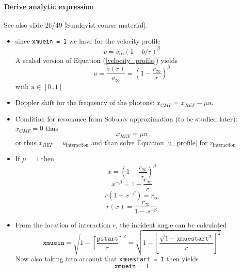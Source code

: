 \documentclass[../main/main.tex]{subfiles}
\begin{document}
\paragraph{\underline{Derive analytic expression}} See also slide  26/49 [Sundqvist course material]. 
\begin{itemize}
\item since \texttt{xmuein = 1} we have for the velocity profile 
\begin{equation}
v = v_{\infty}(1-b/r)^{\beta}
\label{velocity_profile}
\end{equation}
A scaled version of Equation (\ref{velocity_profile}) yields 
\begin{equation}
u = \frac{v(r)}{v_{\infty}} = \left(1 - \frac{r_{\infty}}{r} \right)^{\beta} 
\label{u_profile}
\end{equation}
with $u \in [0..1]$

\item Doppler shift for the frequency of the photons: $x_{CMF} = x_{REF} - \mu u$.
\item Condition for resonance from Sobolov approximation (to be studied later): $\boxed{x_{CMF}= 0}$ thus 
\begin{equation}
x_{REF} = \mu u
\label{analytic_profile}
\end{equation}
or thus $x_{REF} = \boxed{u_{\text{interaction}}}$ and than solve Equation \ref{u_profile} for $r_{\text{interaction}}$

\item If $\mu = 1$ then 
\begin{equation}
x = \left(1 - \frac{r_{\infty}}{r} \right)^{\beta}
\end{equation}
\begin{equation*}
x^{-\beta} = 1 - \frac{r_{\infty}}{r}
\end{equation*}
\begin{equation*}
r(1-x^{-\beta}) = r_{\infty}
\end{equation*}
\begin{equation}
\boxed{r(x) = \frac{r_{\infty}}{1-x^{-\beta}}}
\end{equation} 

\item From the location of interaction $r$, the incident angle can be calculated
\begin{equation}
\texttt{xmuein} = \sqrt{1-\left[\frac{\texttt{pstart}}{r}\right]^2} = \sqrt{1 - \left[ \frac{\sqrt{1-\texttt{xmuestart}^2}}{r} \right]^2}
\end{equation}
Now also taking into account that \texttt{xmuestart = 1} then yields
\begin{equation}
\texttt{xmuein = 1}
\end{equation}


\end{itemize}
\end{document}
